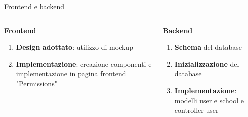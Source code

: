 \documentclass[aspectratio=169]{beamer}
\begin{document}
\begin{frame}[fragile]{Frontend e backend}
	\begin{columns}[T] %
		\begin{column}{0.5\textwidth}
			\textbf{Frontend}
			\begin{enumerate}
				\item \textbf{Design adottato}: utilizzo di mockup
				\item \textbf{Implementazione}: creazione componenti e implementazione in pagina frontend "Permissions"
			\end{enumerate}
		\end{column}
		\begin{column}{0.5\textwidth}
			\textbf{Backend}
			\begin{enumerate}
				\item \textbf{Schema} del database
				\item \textbf{Inizializzazione} del database
				\item \textbf{Implementazione}: modelli user e school e controller user
			\end{enumerate}
		\end{column}
	\end{columns}
\end{frame}
\end{document}

